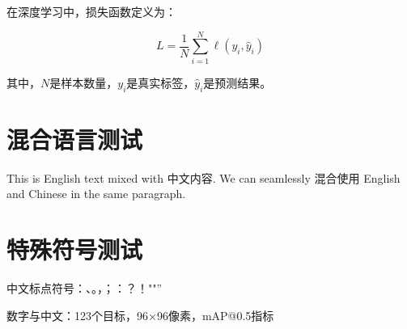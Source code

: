 \documentclass[a4paper,12pt]{article}
\begin{document}
在深度学习中，损失函数定义为：

$$L = \frac{1}{N}\sum_{i=1}^{N} \ell(y_i, \hat{y}_i)$$

其中，$N$是样本数量，$y_i$是真实标签，$\hat{y}_i$是预测结果。

\section{混合语言测试}

This is English text mixed with 中文内容. We can seamlessly 混合使用 English and Chinese in the same paragraph.

\section{特殊符号测试}

中文标点符号：、。，；：？！""''

数字与中文：123个目标，96×96像素，mAP@0.5指标
\end{document}
